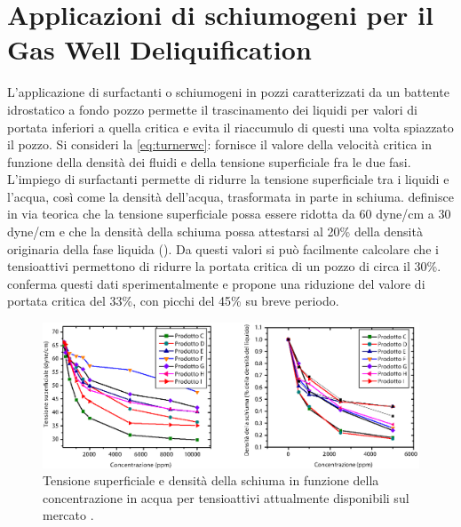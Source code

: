 \section[Applicazione di schiumogeni per GWD]{Applicazioni di schiumogeni per il Gas Well Deliquification} \label{section:foamer-ll}
L'applicazione di surfactanti o schiumogeni in pozzi caratterizzati da un battente idrostatico a fondo pozzo permette il trascinamento dei liquidi per valori di portata inferiori a quella critica e evita il riaccumulo di questi una volta spiazzato il pozzo. Si consideri la \eqref{eq:turnerwc}: \textcite{turner1969analysis} fornisce il valore della velocità critica in funzione della densità dei fluidi e della tensione superficiale fra le due fasi. L'impiego di surfactanti permette di ridurre la tensione superficiale tra i liquidi e l'acqua, così come la densità dell'acqua, trasformata in parte in schiuma. \textcite{campbell2001corrosion} definisce in via teorica che la tensione superficiale possa essere ridotta da 60 dyne/cm a 30 dyne/cm e che la densità della schiuma possa attestarsi al 20\% della densità originaria della fase liquida (). Da questi valori si può facilmente calcolare che i tensioattivi permettono di ridurre la portata critica di un pozzo di circa il 30\%. \textcite{wittfeld2015foam} conferma questi dati sperimentalmente e propone una riduzione del valore di portata critica del 33\%, con picchi del 45\% su breve periodo.

\begin{figure}[htbp]
    \centering
    \includegraphics[width=\textwidth]{fig/foamer/campbell.eps}
    \caption{Tensione superficiale e densità della schiuma in funzione della concentrazione in acqua per tensioattivi attualmente disponibili sul mercato \parencite{campbell2001corrosion}.}
    \label{fig:campbell}
\end{figure}

